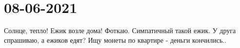  
 
 
 
 
\section{08-06-2021}
\label{sec:kiev.pogoda.08_06_2021}

Солнце, тепло! Ежик возле дома! Фоткаю. Симпатичный такой ежик.
У друга спрашиваю, а ежиков едят? Ищу монеты по квартире - деньги кончились..
